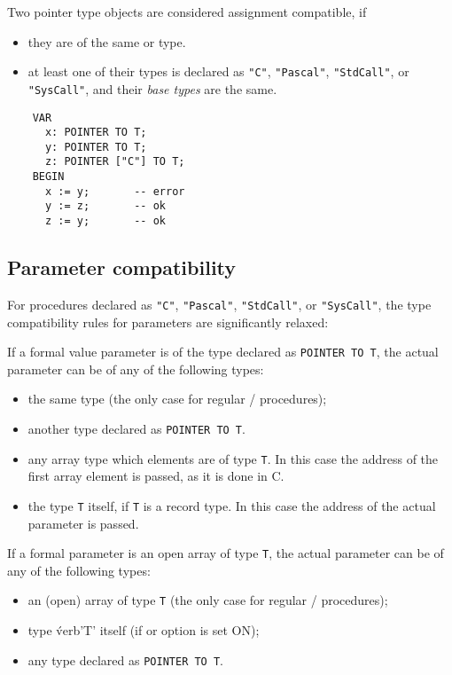 Two pointer type objects are considered assignment compatible, if

\begin{itemize}
\item they are of the same \mt{} or \ot{} type.
\item at least one of their types is declared as
      \verb'"C"', \verb'"Pascal"', \verb'"StdCall"', or \verb'"SysCall"',
      and their {\it base types} are the same.
\end{itemize}

\begin{verbatim}
    VAR
      x: POINTER TO T;
      y: POINTER TO T;
      z: POINTER ["C"] TO T;
    BEGIN
      x := y;       -- error
      y := z;       -- ok
      z := y;       -- ok
\end{verbatim}

\subsection{Parameter compatibility}
\label{multilang:parmcomp}

For procedures declared as \verb'"C"', \verb'"Pascal"',
\verb'"StdCall"', or \verb'"SysCall"', the
type compatibility rules for parameters are significantly relaxed:

If a formal value parameter is of the type declared as \verb'POINTER TO T',
the actual parameter can be of any of the following types:

\begin{itemize}
\item the same type (the only case for regular \mt{}/\ot{}
      procedures);
\item another type declared as \verb'POINTER TO T'.
\item any array type which elements are of type {\tt T}.
      In this case the address of the first array element is passed,
      as it is done in C.
\item the type {\tt T} itself, if {\tt T} is a record type.
      In this case the address of the actual parameter is passed.
\end{itemize}

If a formal parameter is an open array of type \verb'T',
the actual parameter can be of any of the following types:

\begin{itemize}
\item an (open) array of type \verb'T' (the only case for regular \mt{}/\ot{}
      procedures);
\item type \'verb'T' itself (if \iftopspeed or \fi
      option is set ON);
\item any type declared as \verb'POINTER TO T'.
\end{itemize}

